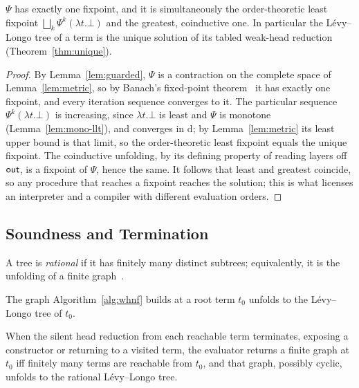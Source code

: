 \begin{theorem}\label{thm:unique-coalgebra}
  $\Psi$ has exactly one fixpoint, and it is simultaneously the order-theoretic least fixpoint $\bigsqcup_k \Psi^k(\lambda t.\bot)$ and the greatest, coinductive one. In particular the L\'evy--Longo tree of a term is the unique solution of its tabled weak-head reduction (Theorem~\ref{thm:unique}).
\end{theorem}
\begin{proof}
  By Lemma~\ref{lem:guarded}, $\Psi$ is a contraction on the complete space of Lemma~\ref{lem:metric}, so by Banach's fixed-point theorem~\cite{banach1922-operations} it has exactly one fixpoint, and every iteration sequence converges to it. The particular sequence $\Psi^k(\lambda t.\bot)$ is increasing, since $\lambda t.\bot$ is least and $\Psi$ is monotone (Lemma~\ref{lem:mono-llt}), and converges in $\mathrm{d}$; by Lemma~\ref{lem:metric} its least upper bound is that limit, so the order-theoretic least fixpoint equals the unique fixpoint. The coinductive unfolding, by its defining property of reading layers off $\mathsf{out}$, is a fixpoint of $\Psi$, hence the same. It follows that least and greatest coincide, so any procedure that reaches a fixpoint reaches the solution; this is what licenses an interpreter and a compiler with different evaluation orders.
\end{proof}

\subsection{Soundness and Termination}\label{sec:tabling}

\begin{definition}[Rational]\label{def:rational}
  A tree is \emph{rational} if it has finitely many distinct subtrees; equivalently, it is the unfolding of a finite graph~\cite{courcelle1983-infinite-trees}.
\end{definition}

\begin{theorem}[Soundness]\label{thm:correctness}
  The graph Algorithm~\ref{alg:whnf} builds at a root term $t_0$ unfolds to the L\'evy--Longo tree of $t_0$.
\end{theorem}

\begin{theorem}[Termination]\label{thm:termination}
  When the silent head reduction from each reachable term terminates, exposing a constructor or returning to a visited term, the evaluator returns a finite graph at $t_0$ iff finitely many terms are reachable from $t_0$, and that graph, possibly cyclic, unfolds to the rational L\'evy--Longo tree.
\end{theorem}

